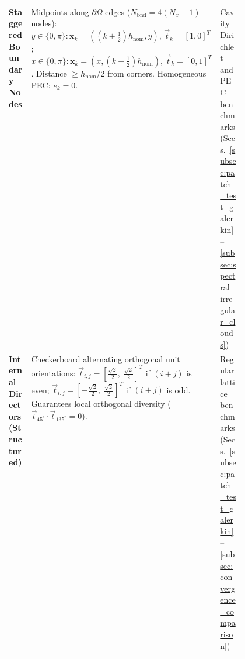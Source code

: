 \documentclass[preprint,12pt]{elsarticle}
\begin{document}
\begin{table}[!htbp]
\begin{tabularx}{\linewidth}{@{}
        >{\raggedright\arraybackslash}p{0.21\linewidth}
        >{\raggedright\arraybackslash}X
        >{\raggedright\arraybackslash}p{0.26\linewidth}
        @{}}
        \textbf{Staggered Boundary Nodes}                                                                                                                                                                                                                                                                   &
        Midpoints along $\partial\Omega$ edges ($N_{\mathrm{bnd}} = 4(N_x - 1)$ nodes): \newline
        $y \in \{0, \pi\}: \mathbf{x}_k = ((k + \frac{1}{2})h_{\mathrm{nom}}, y), \, \vec{t}_k = [1, 0]^T$; \quad $x \in \{0, \pi\}: \mathbf{x}_k = (x, (k + \frac{1}{2})h_{\mathrm{nom}}), \, \vec{t}_k = [0, 1]^T$. \newline
        Distance $\ge h_{\mathrm{nom}}/2$ from corners. Homogeneous PEC: $e_k = 0$.                                                                                                                                                                                                                         &
        Cavity Dirichlet and PEC benchmarks (Secs.~\ref{subsec:patch_test_galerkin}--\ref{subsec:spectral_irregular_clouds})                                                                                                                                                                                  \\
        \textbf{Internal Directors (Structured)}                                                                                                                                                                                                                                                            &
        Checkerboard alternating orthogonal unit orientations: \newline
        $\vec{t}_{i,j} = [\frac{\sqrt{2}}{2}, \; \frac{\sqrt{2}}{2}]^T$ if $(i+j)$ is even; \quad
        $\vec{t}_{i,j} = [-\frac{\sqrt{2}}{2}, \; \frac{\sqrt{2}}{2}]^T$ if $(i+j)$ is odd. \newline
        Guarantees local orthogonal diversity ($\vec{t}_{45^\circ} \cdot \vec{t}_{135^\circ} = 0$).                                                                                                                                                                                                         &
        Regular lattice benchmarks (Secs.~\ref{subsec:patch_test_galerkin}--\ref{subsec:convergence_comparison})                                                                                                                                                                                              \\

\end{tabularx}
\end{table}
\end{document}
